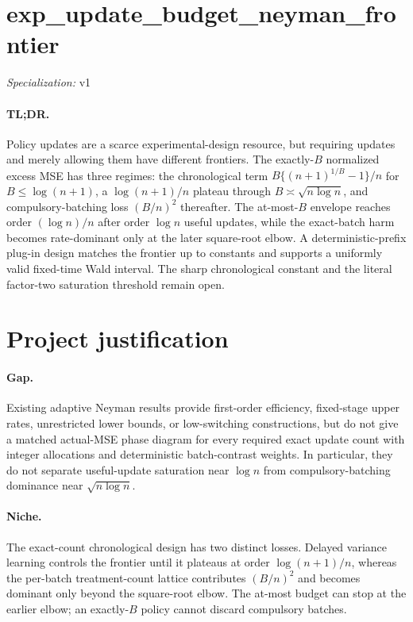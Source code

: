 \documentclass{article}
\begin{document}
\sloppy

\section*{exp\_\allowbreak{}update\_\allowbreak{}budget\_\allowbreak{}neyman\_\allowbreak{}frontier}

\noindent\textit{Specialization:} v1\par

\paragraph{TL;DR.} Policy updates are a scarce experimental-design resource, but requiring updates and merely allowing them have different frontiers. The exactly-\(B\) normalized excess MSE has three regimes: the chronological term \(B\{(n+1)^{1/B}-1\}/n\) for \(B\leq\log(n+1)\), a \(\log(n+1)/n\) plateau through \(B\asymp\sqrt{n\log n}\), and compulsory-batching loss \((B/n)^2\) thereafter. The at-most-\(B\) envelope reaches order \((\log n)/n\) after order \(\log n\) useful updates, while the exact-batch harm becomes rate-dominant only at the later square-root elbow. A deterministic-prefix plug-in design matches the frontier up to constants and supports a uniformly valid fixed-time Wald interval. The sharp chronological constant and the literal factor-two saturation threshold remain open.

\section{Project justification}

\paragraph{Gap.} Existing adaptive Neyman results provide first-order efficiency, fixed-stage upper rates, unrestricted lower bounds, or low-switching constructions, but do not give a matched actual-MSE phase diagram for every required exact update count with integer allocations and deterministic batch-contrast weights. In particular, they do not separate useful-update saturation near \(\log n\) from compulsory-batching dominance near \(\sqrt{n\log n}\).

\paragraph{Niche.} The exact-count chronological design has two distinct losses. Delayed variance learning controls the frontier until it plateaus at order \(\log(n+1)/n\), whereas the per-batch treatment-count lattice contributes \((B/n)^2\) and becomes dominant only beyond the square-root elbow. The at-most budget can stop at the earlier elbow; an exactly-\(B\) policy cannot discard compulsory batches.
\end{document}
